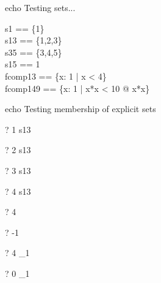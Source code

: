%


echo Testing sets...

\begin{zed}
s1  == \{1\} \\
s13 == \{1,2,3\} \\
s35 == \{3,4,5\} \\
s15 == 1  \\
fcomp13 == \{x: 1  | x < 4\} \\
fcomp149 == \{x: 1  | x*x < 10 @ x*x\}
\end{zed}


echo     Testing membership of explicit sets
\begin{zed} \vdash?  1  \in s13 \end{zed}
\begin{zed} \vdash?  2  \in s13 \end{zed}
\begin{zed} \vdash?  3  \in s13 \end{zed}
\begin{zed} \vdash?  4  \notin s13 \end{zed}
\begin{zed} \vdash?  4  \in \nat \end{zed}
\begin{zed} \vdash?  -1 \notin \nat \end{zed}
\begin{zed} \vdash?  4  \in \nat_1 \end{zed}
\begin{zed} \vdash?  0  \notin \nat_1 \end{zed}


